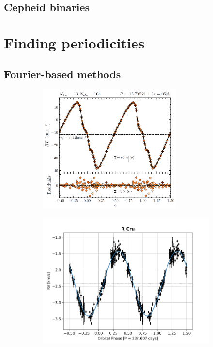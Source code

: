         \subsection{Cepheid binaries}
    \section{Finding periodicities}
    \label{finding_periods}
        \subsection{Fourier-based methods}

        
        \begin{figure}[H]
        \centering
        \begin{subfigure}{.45\textwidth}
            \centering
            \includegraphics[width=0.8\textwidth]{report/images/chap2_foundations/fourier_fit.png}
        \end{subfigure}%
        \hspace{1em}
        \begin{subfigure}{.45\textwidth}
            \centering
            \includegraphics[width=\textwidth]{report/images/chap2_foundations/rcru_orbital.png}

\end{subfigure}
\end{figure}
